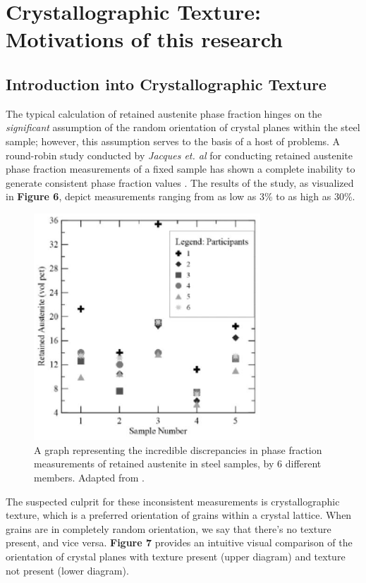 \documentclass[10pt]{article}
\begin{document}
\section{Crystallographic Texture: Motivations of this research}
\subsection{Introduction into Crystallographic Texture}
The typical calculation of retained austenite phase fraction hinges on the \emph{significant} assumption of the random orientation of crystal planes
within the steel sample; however, this assumption serves to the basis of a host of problems. A round-robin study conducted by \textit{Jacques et. al} 
for conducting retained austenite phase fraction measurements of a fixed sample has shown a complete inability to generate consistent phase fraction values \cite{ref07}. 
The results of the study, as visualized in \textbf{Figure 6}, depict measurements ranging from as low as 3\% to as high as 30\%.

\begin{figure}[h]
    \centering
    \includegraphics[width=8.5cm]{fig6}
    \caption{\label{tab1}A graph representing the incredible discrepancies in phase fraction measurements of retained austenite 
    in steel samples, by 6 different members. Adapted from \cite{ref07}.} 
    \end{figure}

The suspected culprit for these inconsistent measurements is crystallographic texture, which is a preferred orientation of grains
within a crystal lattice. When grains are in completely random orientation, we say that there's no texture
present, and vice versa. \textbf{Figure 7} provides an intuitive visual comparison of the orientation of crystal planes with texture present
(upper diagram) and texture not present (lower diagram).
\end{document}

